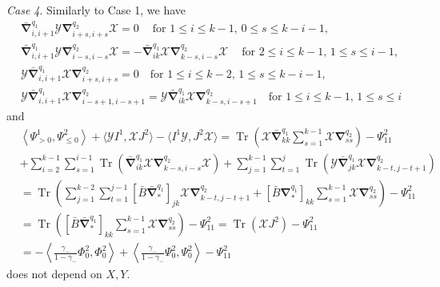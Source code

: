 \documentclass{amsart}
\theoremstyle{definition}
\theoremstyle{remark}
\numberwithin{equation}{section}
\numberwithin{theorem}{section}
\begin{document}
{\em Case 4}. Similarly to Case 1, we have
\begin{equation*}
\begin{aligned}
&\bar{\boldsymbol\nabla}_{i,i+1}^{q_1} {{\mathcal Y}} {\boldsymbol\nabla}_{i+s,i+s}^{q_2} {{\mathcal X}}=0 \ 
\quad \text{for $1\leq i\leq k-1$, $0\leq s \leq k-i-1$},\\
& 
\bar{\boldsymbol\nabla}_{i,i+1}^{q_1} {{\mathcal Y}} {\boldsymbol\nabla}_{i-s,i-s}^{q_2} {{\mathcal X}}=-\bar{\boldsymbol\nabla}_{ik}^{q_1} {{\mathcal X}} {\boldsymbol\nabla}_{k-s,i-s}^{q_2} {{\mathcal X}}\ 
\quad \text{for $2\leq i\leq k-1$, $1\leq s \leq i-1$},\\
&{{\mathcal Y}}\bar{\boldsymbol\nabla}_{i,i+1}^{q_1} {{\mathcal X}} {\boldsymbol\nabla}_{i+s,i+s}^{q_2} = 0 \quad \text{for $1\leq i\leq k-2$,  $1\leq s \leq k-i-1$},\\
& 
{{\mathcal Y}}\bar {\boldsymbol\nabla}_{i,i+1}^{q_1} {{\mathcal X}} {\boldsymbol\nabla}_{i-s+1,i-s+1}^{q_2} =
{{\mathcal Y}}\bar{\boldsymbol\nabla}_{ik}^{q_1} {{\mathcal X}} {\boldsymbol\nabla}_{k-s,i-s+1}^{q_2} 
\quad\text{for $1\leq i\leq k-1$, $1\leq s \leq  i$}\ 
\end{aligned}
\end{equation*}
and
\begin{equation}\label{bad4}
\begin{aligned}
&\left \langle 
\Psi^1_{>0}, \Psi^2_{\leq 0} \right \rangle +  \langle {{\mathcal Y}} I^1,{{\mathcal X}} J^2\rangle  -  \langle I^1{{\mathcal Y}}, J^2{{\mathcal X}}\rangle = 
{\operatorname{Tr}}\left ({{\mathcal X}}\bar{\boldsymbol\nabla}^{q_1}_{kk}
\sum_{s=1}^{k-1} {{\mathcal X}} {\boldsymbol\nabla}_{ss}^{q_2} \right ) -{\Psi}_{11}^2
\\
&
+ \sum_{i=2}^{k-1} \sum_{s=1}^{i-1}{\operatorname{Tr}}\left(\bar {\boldsymbol\nabla}_{ik}^{q_1} {{\mathcal X}} {\boldsymbol\nabla}_{k-s,i-s}^{q_2} {{\mathcal X}}\right) +
\sum_{j=1}^{k-1} \sum_{t=1}^{j} {\operatorname{Tr}}\left({{\mathcal Y}}\bar{\boldsymbol\nabla}_{jk}^{q_1} {{\mathcal X}} {\boldsymbol\nabla}_{k-t,j-t+1}^{q_2}\right) 
\\
&
= {\operatorname{Tr}}\left(
\sum_{j=1}^{k-2} \sum_{t=1}^{j-1}[\bar B\bar {\boldsymbol\nabla}^{q_1}_*]_{jk}
{{\mathcal X}} {\boldsymbol\nabla}_{k-t,j-t+1}^{q_2}  +
[\bar B {\boldsymbol\nabla}^{q_1}_*]_{kk}\sum_{s=1}^{k-1}  {{\mathcal X}} {\boldsymbol\nabla}_{ss}^{q_2}  \right ) - {\Psi}^2_{11}
\\
&
={\operatorname{Tr}} \left ([\bar B\bar {\boldsymbol\nabla}^{q_1}_*]_{kk} 
 \sum_{s=1}^{k-1} {{\mathcal X}} {\boldsymbol\nabla}_{ss}^{q_2}\right )  - {\Psi}^2_{11}
={\operatorname{Tr}}({{\mathcal X}} J^2) - {\Psi}^2_{11}\\
&=-\left\langle \frac{\gamma_-}{1-\gamma_-}{\Phi}_0^2,{\Phi}_0^2\right\rangle+
\left\langle \frac{\gamma_-}{1-\gamma_-}{\Psi}_0^2,{\Psi}_0^2\right\rangle-{\Psi}_{11}^2
\end{aligned}
\end{equation}
does not depend on $X, Y$.
\end{document}
